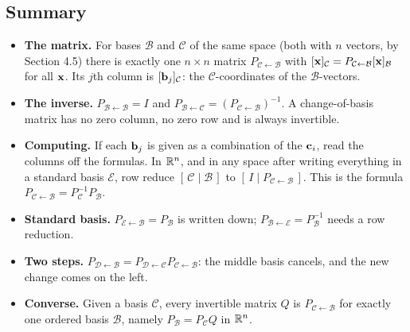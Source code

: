 \documentclass[11pt]{article}
\begin{document}
\subsection*{Summary}
\begin{itemize}
  \item \textbf{The matrix.} For bases $\mathcal{B}$ and $\mathcal{C}$ of the same space (both with $n$ vectors, by Section 4.5) there is exactly one $n\times n$ matrix $P_{\mathcal{C}\leftarrow\mathcal{B}}$ with $[\mathbf{x}]_{\mathcal{C}}=P_{\mathcal{C}\leftarrow\mathcal{B}}[\mathbf{x}]_{\mathcal{B}}$ for all $\mathbf{x}$. Its $j$th column is $[\mathbf{b}_j]_{\mathcal{C}}$: the $\mathcal{C}$-coordinates of the $\mathcal{B}$-vectors.
  \item \textbf{The inverse.} $P_{\mathcal{B}\leftarrow\mathcal{B}}=I$ and $P_{\mathcal{B}\leftarrow\mathcal{C}}=\left(P_{\mathcal{C}\leftarrow\mathcal{B}}\right)^{-1}$. A change-of-basis matrix has no zero column, no zero row and is always invertible.
  \item \textbf{Computing.} If each $\mathbf{b}_j$ is given as a combination of the $\mathbf{c}_i$, read the columns off the formulas. In $\mathbb{R}^n$, and in any space after writing everything in a standard basis $\mathcal{E}$, row reduce $[\,\mathcal{C}\mid\mathcal{B}\,]$ to $[\,I\mid P_{\mathcal{C}\leftarrow\mathcal{B}}\,]$. This is the formula $P_{\mathcal{C}\leftarrow\mathcal{B}}=P_{\mathcal{C}}^{-1}P_{\mathcal{B}}$.
  \item \textbf{Standard basis.} $P_{\mathcal{E}\leftarrow\mathcal{B}}=P_{\mathcal{B}}$ is written down; $P_{\mathcal{B}\leftarrow\mathcal{E}}=P_{\mathcal{B}}^{-1}$ needs a row reduction.
  \item \textbf{Two steps.} $P_{\mathcal{D}\leftarrow\mathcal{B}}=P_{\mathcal{D}\leftarrow\mathcal{C}}P_{\mathcal{C}\leftarrow\mathcal{B}}$: the middle basis cancels, and the new change comes on the left.
  \item \textbf{Converse.} Given a basis $\mathcal{C}$, every invertible matrix $Q$ is $P_{\mathcal{C}\leftarrow\mathcal{B}}$ for exactly one ordered basis $\mathcal{B}$, namely $P_{\mathcal{B}}=P_{\mathcal{C}}Q$ in $\mathbb{R}^n$.
\end{itemize}
\end{document}
